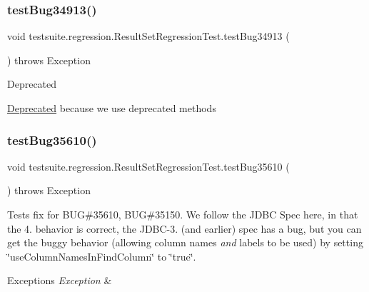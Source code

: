\subsubsection{\texorpdfstring{test\+Bug34913()}{testBug34913()}}
{\footnotesize\ttfamily void testsuite.\+regression.\+Result\+Set\+Regression\+Test.\+test\+Bug34913 (\begin{DoxyParamCaption}{ }\end{DoxyParamCaption}) throws Exception}

\begin{DoxyRefDesc}{Deprecated}
\item[\mbox{\hyperlink{deprecated__deprecated000024}{Deprecated}}]because we use deprecated methods \end{DoxyRefDesc}
\mbox{\label{classtestsuite_1_1regression_1_1_result_set_regression_test_a8542bd8a4dd0127b113219d416c5be53}} 
\subsubsection{\texorpdfstring{test\+Bug35610()}{testBug35610()}}
{\footnotesize\ttfamily void testsuite.\+regression.\+Result\+Set\+Regression\+Test.\+test\+Bug35610 (\begin{DoxyParamCaption}{ }\end{DoxyParamCaption}) throws Exception}

Tests fix for B\+UG\#35610, B\+UG\#35150. We follow the J\+D\+BC Spec here, in that the 4. behavior is correct, the J\+D\+B\+C-\/3. (and earlier) spec has a bug, but you can get the buggy behavior (allowing column names {\itshape and} labels to be used) by setting \char`\"{}use\+Column\+Names\+In\+Find\+Column\char`\"{} to \char`\"{}true\char`\"{}.


\begin{DoxyExceptions}{Exceptions}
{\em Exception} & \\
\hline
\end{DoxyExceptions}
\mbox{\label{classtestsuite_1_1regression_1_1_result_set_regression_test_ae79fca0bd7d22ac046c30b0e69ae46e5}} 
